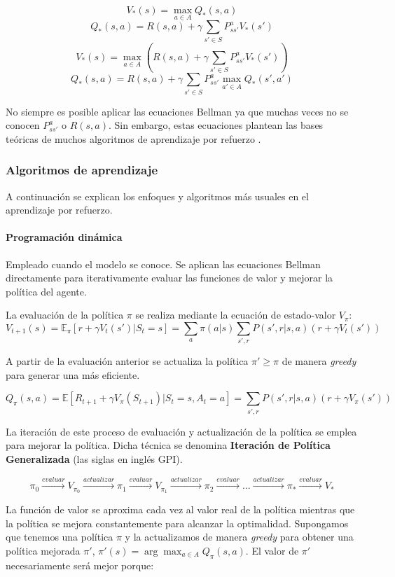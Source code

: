 \[V_*(s)=\max_{a \in A}Q_*(s,a)\]
\[Q_*(s,a) = R(s, a) + \gamma \sum_{s' \in S} P_{ss'}^a V_*(s')\]
\[V_*(s)=\max_{a \in A}(R(s, a) + \gamma \sum_{s' \in S} P_{ss'}^a V_*(s'))\]
\[Q_*(s,a) = R(s, a) + \gamma \sum_{s' \in S} P_{ss'}^a \max_{a' \in A}Q_*(s',a')\]

No siempre es posible aplicar las ecuaciones Bellman ya que muchas veces no se conocen $P_{ss'}^a$ o $R(s,a)$. Sin embargo, estas ecuaciones plantean las bases teóricas de muchos algoritmos de aprendizaje por refuerzo \cite{lilLogRL}.

\subsubsection{Algoritmos de aprendizaje}

A continuación se explican los enfoques y algoritmos más usuales en el aprendizaje por refuerzo.  

\paragraph{Programación dinámica} Empleado cuando el modelo se conoce.  Se aplican las ecuaciones Bellman directamente para iterativamente evaluar las funciones de valor y mejorar la política del agente. 

La evaluación de la política $\pi$ se realiza mediante la ecuación de estado-valor $V_\pi$:
\[V_{t+1}(s)=\mathbb{E}_\pi[r + \gamma V_t(s')|S_t=s]=\sum_a \pi(a|s)\sum_{s', r}P(s', r|s, a)(r + \gamma V_t(s'))\]

A partir de la evaluación anterior se actualiza la política $\pi' \geq \pi$ de manera \textit{greedy} para generar una más eficiente.

\[Q_\pi(s, a) = \mathbb{E}[R_{t+1} + \gamma V_\pi(S_{t+1})|S_t = s, A_t = a] = \sum_{s', r}P(s', r|s, a)(r + \gamma V_\pi(s'))\]

La iteración de este proceso de evaluación y actualización de la política se emplea para mejorar la política. Dicha técnica se denomina \textbf{Iteración de Política Generalizada} (las siglas en inglés GPI). 

\[\pi_0 \overset{evaluar}{\longrightarrow} V_{\pi_0} \overset{actualizar}{\longrightarrow} \pi_1 \overset{evaluar}{\longrightarrow} V_{\pi_1} \overset{actualizar}{\longrightarrow} \pi_2 \overset{evaluar}{\longrightarrow} \ldots  \overset{actualizar}{\longrightarrow} \pi_* \overset{evaluar}{\longrightarrow} V_*\]

La función de valor se aproxima cada vez al valor real de la política mientras que la política se mejora constantemente para alcanzar la optimalidad. Supongamos que tenemos una política $\pi$ y la actualizamos de manera \textit{greedy} para obtener una política mejorada $\pi'$, $\pi'(s)=\arg \max_{a\in A}Q_\pi(s, a)$. El valor de $\pi'$ necesariamente será mejor porque:

